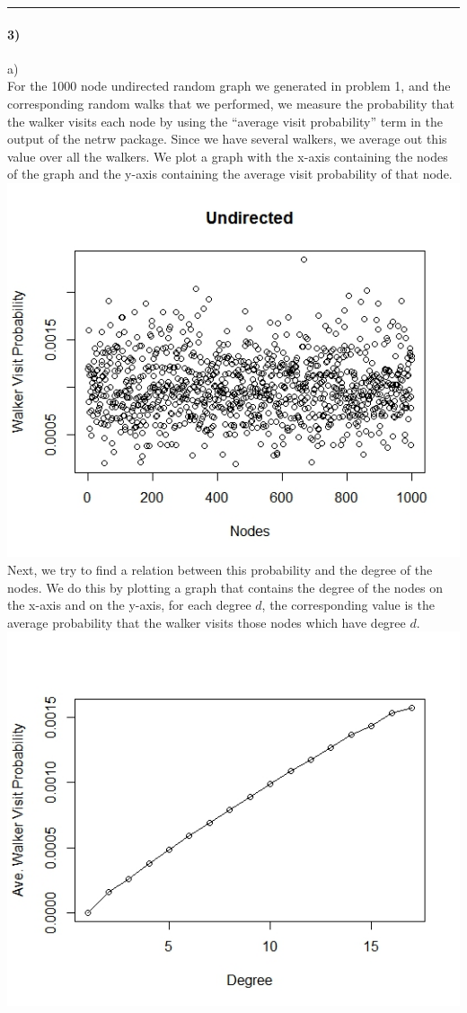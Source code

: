 \documentclass{article}
\begin{document}
\hrule

\paragraph{3)}
a)\\
For the 1000 node undirected random graph we generated in problem 1, and the corresponding random walks that we performed,
we measure the probability that the walker visits each node by using the ``average visit probability'' term
in the output of the netrw package. Since we have several walkers, we average out this value over all the walkers.
We plot a graph with the x-axis containing the nodes of the graph and the y-axis containing the 
average visit probability of that node.\\
\includegraphics[scale=0.4]{p3a} \\
Next, we try to find a relation between this probability and the degree of the nodes.
We do this by plotting a graph that contains the degree of the nodes on the x-axis and on the y-axis,
for each degree $d$, the corresponding value is the average probability that the walker visits those nodes which
have degree $d$.\\
\includegraphics[scale=0.4]{p3b} \\
\end{document}
